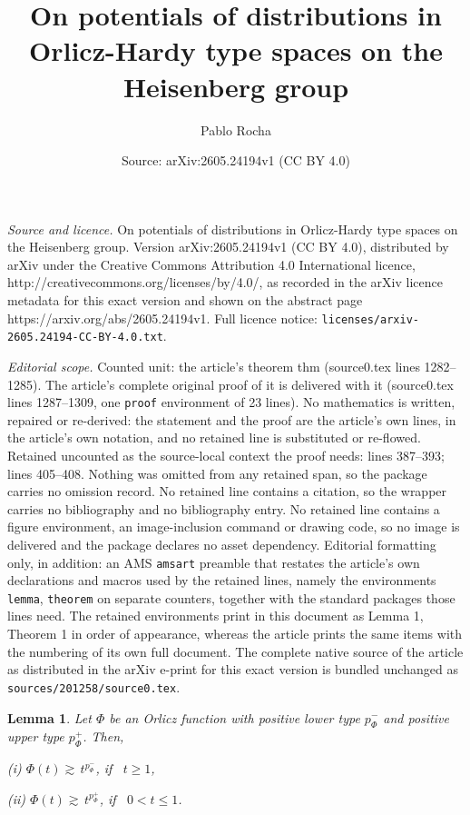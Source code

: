 \documentclass[10pt,a4paper]{amsart}
\title{On potentials of distributions in Orlicz-Hardy type spaces on the Heisenberg group}
\author{Pablo Rocha}
\date{Source: arXiv:2605.24194v1 (CC BY 4.0)}
\newtheorem{lemma}{Lemma}
\begin{document}
\maketitle

\noindent\emph{Source and licence.} On potentials of distributions in Orlicz-Hardy type spaces on the Heisenberg group. Version arXiv:2605.24194v1 (CC BY 4.0), distributed by arXiv under the Creative Commons Attribution 4.0 International licence, http://creativecommons.org/licenses/by/4.0/, as recorded in the arXiv licence metadata for this exact version and shown on the abstract page https://arxiv.org/abs/2605.24194v1. Full licence notice: \texttt{licenses/arxiv-2605.24194-CC-BY-4.0.txt}.\par\smallskip

\noindent\textit{Editorial scope.} Counted unit: the article's theorem thm (source0.tex lines 1282--1285). The article's complete original proof of it is delivered with it (source0.tex lines 1287--1309, one \texttt{proof} environment of 23 lines). No mathematics is written, repaired or re-derived: the statement and the proof are the article's own lines, in the article's own notation, and no retained line is substituted or re-flowed.  Retained uncounted as the source-local context the proof needs: lines 387--393; lines 405--408.  Nothing was omitted from any retained span, so the package carries no omission record.  No retained line contains a citation, so the wrapper carries no bibliography and no bibliography entry.  No retained line contains a figure environment, an image-inclusion command or drawing code, so no image is delivered and the package declares no asset dependency.  Editorial formatting only, in addition: an AMS \texttt{amsart} preamble that restates the article's own declarations and macros used by the retained lines, namely the environments \texttt{lemma}, \texttt{theorem} on separate counters, together with the standard packages those lines need.  The retained environments print in this document as Lemma 1, Theorem 1 in order of appearance, whereas the article prints the same items with the numbering of its own full document.  The complete native source of the article as distributed in the arXiv e-print for this exact version is bundled unchanged as \texttt{sources/201258/source0.tex}.
\begin{lemma} \label{lower estim}
Let $\Phi$ be an Orlicz function with positive lower type $p_{\Phi}^{-}$ and positive upper type $p_{\Phi}^{+}$. Then,

(i) $\Phi(t) \gtrsim \, t^{p_{\Phi}^{-}}$, if \, $t \geq 1$,

(ii) $\Phi(t) \gtrsim \, t^{p_{\Phi}^{+}}$, if \, $0 < t \leq 1$.
\end{lemma}
\end{document}
